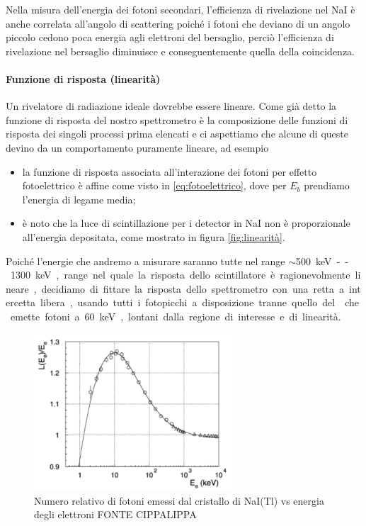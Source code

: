  
 Nella misura dell'energia dei fotoni secondari, l'efficienza di rivelazione nel NaI è anche correlata all'angolo di scattering poiché i fotoni che deviano di un angolo piccolo cedono poca energia agli elettroni del bersaglio, perciò l'efficienza di rivelazione nel bersaglio diminuisce e conseguentemente quella della coincidenza.
 
 \paragraph{Funzione di risposta (linearità)}
 Un rivelatore di radiazione ideale dovrebbe essere lineare. Come già detto la funzione di risposta del nostro spettrometro è la composizione delle funzioni di risposta dei singoli processi prima elencati e ci aspettiamo che alcune di queste devino da un comportamento puramente lineare, ad esempio
 \begin{itemize}
 	\item la funzione di risposta associata all'interazione dei fotoni per effetto fotoelettrico è affine come visto in \autoref{eq:fotoelettrico}, dove per $E_b$ prendiamo l'energia di legame media;
 	\item è noto che la luce di scintillazione per i detector in NaI non è proporzionale all'energia depositata, come mostrato in figura \autoref{fig:linearità}.
 \end{itemize}
 Poiché l'energie che andremo a misurare saranno tutte nel range $\sim$\SI{500}keV--\SI{1300}{keV}, range nel quale la risposta dello scintillatore è ragionevolmente lineare, decidiamo di fittare la risposta dello spettrometro con una retta a intercetta libera, usando tutti i fotopicchi a disposizione tranne quello del \am{} che emette fotoni a \SI{60}keV, lontani dalla regione di interesse e di linearità.
 
 \begin{figure}[h]
	\centering
	\includegraphics[width=20em]{linearita}
	\caption{\label{fig:linearità}Numero relativo di fotoni emessi dal cristallo di NaI(Tl) vs energia degli elettroni FONTE CIPPALIPPA}
 \end{figure}
 
